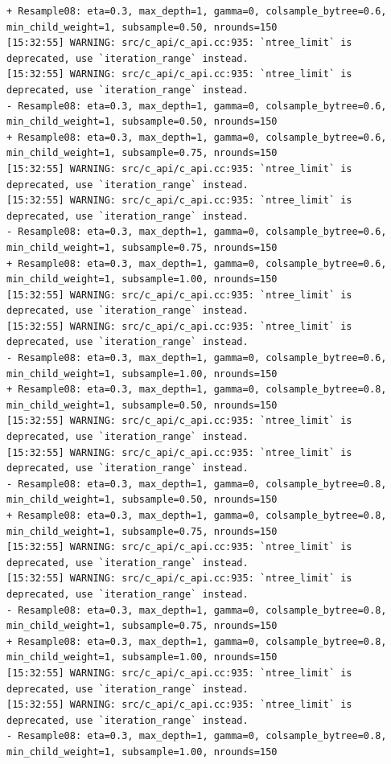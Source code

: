 \documentclass[
  letterpaper,
  DIV=11,
  numbers=noendperiod]{scrartcl}
\begin{document}
\begin{verbatim}
+ Resample08: eta=0.3, max_depth=1, gamma=0, colsample_bytree=0.6, min_child_weight=1, subsample=0.50, nrounds=150 
[15:32:55] WARNING: src/c_api/c_api.cc:935: `ntree_limit` is deprecated, use `iteration_range` instead.
[15:32:55] WARNING: src/c_api/c_api.cc:935: `ntree_limit` is deprecated, use `iteration_range` instead.
- Resample08: eta=0.3, max_depth=1, gamma=0, colsample_bytree=0.6, min_child_weight=1, subsample=0.50, nrounds=150 
+ Resample08: eta=0.3, max_depth=1, gamma=0, colsample_bytree=0.6, min_child_weight=1, subsample=0.75, nrounds=150 
[15:32:55] WARNING: src/c_api/c_api.cc:935: `ntree_limit` is deprecated, use `iteration_range` instead.
[15:32:55] WARNING: src/c_api/c_api.cc:935: `ntree_limit` is deprecated, use `iteration_range` instead.
- Resample08: eta=0.3, max_depth=1, gamma=0, colsample_bytree=0.6, min_child_weight=1, subsample=0.75, nrounds=150 
+ Resample08: eta=0.3, max_depth=1, gamma=0, colsample_bytree=0.6, min_child_weight=1, subsample=1.00, nrounds=150 
[15:32:55] WARNING: src/c_api/c_api.cc:935: `ntree_limit` is deprecated, use `iteration_range` instead.
[15:32:55] WARNING: src/c_api/c_api.cc:935: `ntree_limit` is deprecated, use `iteration_range` instead.
- Resample08: eta=0.3, max_depth=1, gamma=0, colsample_bytree=0.6, min_child_weight=1, subsample=1.00, nrounds=150 
+ Resample08: eta=0.3, max_depth=1, gamma=0, colsample_bytree=0.8, min_child_weight=1, subsample=0.50, nrounds=150 
[15:32:55] WARNING: src/c_api/c_api.cc:935: `ntree_limit` is deprecated, use `iteration_range` instead.
[15:32:55] WARNING: src/c_api/c_api.cc:935: `ntree_limit` is deprecated, use `iteration_range` instead.
- Resample08: eta=0.3, max_depth=1, gamma=0, colsample_bytree=0.8, min_child_weight=1, subsample=0.50, nrounds=150 
+ Resample08: eta=0.3, max_depth=1, gamma=0, colsample_bytree=0.8, min_child_weight=1, subsample=0.75, nrounds=150 
[15:32:55] WARNING: src/c_api/c_api.cc:935: `ntree_limit` is deprecated, use `iteration_range` instead.
[15:32:55] WARNING: src/c_api/c_api.cc:935: `ntree_limit` is deprecated, use `iteration_range` instead.
- Resample08: eta=0.3, max_depth=1, gamma=0, colsample_bytree=0.8, min_child_weight=1, subsample=0.75, nrounds=150 
+ Resample08: eta=0.3, max_depth=1, gamma=0, colsample_bytree=0.8, min_child_weight=1, subsample=1.00, nrounds=150 
[15:32:55] WARNING: src/c_api/c_api.cc:935: `ntree_limit` is deprecated, use `iteration_range` instead.
[15:32:55] WARNING: src/c_api/c_api.cc:935: `ntree_limit` is deprecated, use `iteration_range` instead.
- Resample08: eta=0.3, max_depth=1, gamma=0, colsample_bytree=0.8, min_child_weight=1, subsample=1.00, nrounds=150 

\end{verbatim}
\end{document}
